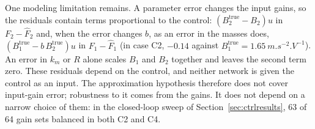One modeling limitation remains. A parameter error changes the input gains, so
the residuals contain terms proportional to the control:
$(B_2^{\mathrm{true}}-B_2)u$ in $F_2-\hat F_2$ and, when the error changes $b$,
as an error in the masses does, $(B_1^{\mathrm{true}}-b\,B_2^{\mathrm{true}})u$
in $F_1-\hat F_1$ (in case C2, $-0.14$ against
$B_1^{\mathrm{true}}=\SI{1.65}{m.s^{-2}.V^{-1}}$). An error in $k_m$ or $R$
alone scales $B_1$ and $B_2$ together and leaves the second term zero. These
residuals depend on the control, and neither network is given the control
as an input. The approximation hypothesis therefore does not cover input-gain
error; robustness to it comes from the gains. It does not depend on a narrow
choice of them: in the closed-loop sweep of Section~\ref{sec:ctrlresults}, 63 of
64 gain sets balanced in both C2 and C4.
